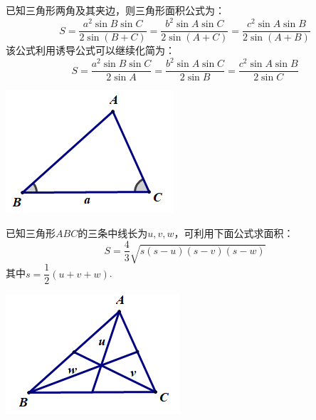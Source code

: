 \documentclass[10pt]{ctexart}
\begin{document}
\begin{minipage}[t]{0.7\textwidth}
\begin{dkli}{}{}
已知三角形两角及其夹边，则三角形面积公式为：
\[S=\dfrac{a^2 \sin{B} \sin{C}}{2\sin(B+C)}=\dfrac{b^2 \sin{A} \sin{C}}{2\sin(A+C)}=\dfrac{c^2 \sin{A} \sin{B}}{2\sin(A+B)}\]
该公式利用诱导公式可以继续化简为：
\[S=\dfrac{a^2 \sin{B} \sin{C}}{2\sin A}=\dfrac{b^2 \sin{A} \sin{C}}{2\sin B}=\dfrac{c^2 \sin{A} \sin{B}}{2\sin C}\]
\end{dkli}
\end{minipage}
\begin{minipage}[t]{0.3\textwidth}
\includegraphics[scale=0.6]{figure/mj-08.png}
\end{minipage}


\begin{minipage}[t]{0.7\textwidth}
\begin{dkli}{}{}
已知三角形$ABC$的三条中线长为$u,v,w$，可利用下面公式求面积：
\[S=\dfrac{4}{3}\sqrt{s(s-u)(s-v)(s-w)}\]
其中$s=\dfrac{1}{2}(u+v+w)$.
\end{dkli}
\end{minipage}
\begin{minipage}[t]{0.3\textwidth}
\includegraphics[scale=0.6]{figure/mj-11.png}
\end{minipage}
\end{document}
